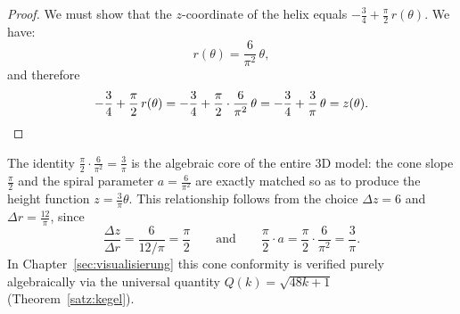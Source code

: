 \begin{proof}
We must show that the $z$-coordinate of the helix equals
$-\tfrac{3}{4} + \tfrac{\pi}{2}\,r(\theta)$. We have:
\[
  r(\theta) = \frac{6}{\pi^2}\,\theta,
\]
and therefore
\[
  -\frac{3}{4} + \frac{\pi}{2}\,r(\theta)
  = -\frac{3}{4} + \frac{\pi}{2}\cdot\frac{6}{\pi^2}\,\theta
  = -\frac{3}{4} + \frac{3}{\pi}\,\theta
  = z(\theta). \qedhere
\]
\end{proof}

\begin{remark}\label{rem:algebraic-core}
The identity $\frac{\pi}{2}\cdot\frac{6}{\pi^2} = \frac{3}{\pi}$ is the
algebraic core of the entire 3D model: the cone slope $\frac{\pi}{2}$ and
the spiral parameter $a = \frac{6}{\pi^2}$ are exactly matched so as to
produce the height function $z = \frac{3}{\pi}\theta$. This relationship
follows from the choice $\Delta z = 6$ and $\Delta r = \frac{12}{\pi}$,
since
\[
  \frac{\Delta z}{\Delta r} = \frac{6}{12/\pi} = \frac{\pi}{2}
  \qquad\text{and}\qquad
  \frac{\pi}{2}\cdot a = \frac{\pi}{2}\cdot\frac{6}{\pi^2} = \frac{3}{\pi}.
\]
In Chapter~\ref{sec:visualisierung} this cone conformity is verified purely
algebraically via the universal quantity $Q(k) = \sqrt{48k+1}$
(Theorem~\ref{satz:kegel}).
\end{remark}

